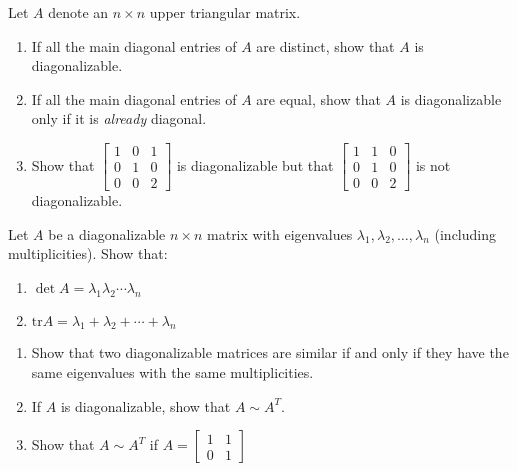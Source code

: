 \documentclass{ximera}
\begin{document}
\begin{problem}
Let $A$ denote an $n \times n$ upper triangular matrix.
\begin{enumerate}

\item If all the main diagonal entries of $A$ are distinct, show that $A$ is diagonalizable.

\item If all the main diagonal entries of $A$ are equal, show that $A$ is diagonalizable only if it is \textit{already} diagonal.

\item Show that $\begin{bmatrix}
1 & 0 & 1 \\
0 & 1 & 0 \\
0 & 0 & 2
\end{bmatrix}$ is diagonalizable but that $\begin{bmatrix}
 1 & 1 & 0 \\
 0 & 1 & 0 \\
 0 & 0 & 2
 \end{bmatrix}$ is not diagonalizable.
 
\end{enumerate}

\end{problem}

\begin{problem}
Let $A$ be a diagonalizable $n \times n$ matrix with eigenvalues $\lambda_{1}, \lambda_{2}, \dots, \lambda_{n}$ (including multiplicities). Show that:

\begin{enumerate}
\item $\det A = \lambda_{1}\lambda_{2}\cdots \lambda_{n}$
\item $\mbox{tr} A = \lambda_{1} + \lambda_{2} + \cdots + \lambda_{n}$
\end{enumerate}
\end{problem}

\begin{problem}
\begin{enumerate}

\item Show that two diagonalizable matrices are similar if and only if they have the same eigenvalues with the same multiplicities.

\item If $A$ is diagonalizable, show that $A \sim A^{T}$.

\item Show that $A \sim A^{T}$ if
 $A = \begin{bmatrix}
 1 & 1 \\
 0 & 1
 \end{bmatrix}$

\end{enumerate}
\end{problem}
\end{document}
